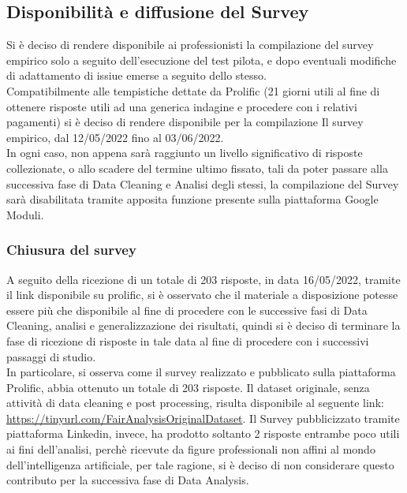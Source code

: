     
    \subsection{Disponibilità e diffusione del Survey}
    Si è deciso di rendere disponibile ai professionisti la compilazione del survey empirico solo a seguito dell'esecuzione del test pilota, e dopo eventuali modifiche di adattamento di issiue emerse a seguito dello stesso.\\ Compatibilmente alle tempistiche dettate da Prolific (21 giorni utili al fine di ottenere risposte utili ad una generica indagine e procedere con i relativi pagamenti) si è deciso di rendere disponibile per la compilazione Il survey empirico, dal 12/05/2022 fino al 03/06/2022.\\
    
    In ogni caso, non appena sarà raggiunto un livello significativo di risposte collezionate, o allo scadere del termine ultimo fissato, tali da poter passare alla successiva fase di Data Cleaning e Analisi degli stessi, la compilazione del Survey sarà disabilitata tramite apposita funzione presente sulla piattaforma Google Moduli.
    
    \subsubsection{Chiusura del survey}
    A seguito della ricezione di un totale di 203 risposte, in data 16/05/2022, tramite il link disponibile su prolific, si è osservato che il materiale a disposizione potesse essere più che disponibile al fine di procedere con le successive fasi di Data Cleaning, analisi e generalizzazione dei risultati, quindi si è deciso di terminare la fase di ricezione di risposte in tale data al fine di procedere con i successivi passaggi di studio.\\
    In particolare, si osserva come il survey realizzato e pubblicato sulla piattaforma Prolific, abbia ottenuto un totale di 203 risposte. Il dataset originale, senza attività di data cleaning e post processing, risulta disponibile al seguente link: \url{https://tinyurl.com/FairAnalysisOriginalDataset}. Il Survey pubblicizzato tramite piattaforma Linkedin, invece, ha prodotto soltanto 2 risposte entrambe poco utili ai fini dell'analisi, perchè ricevute da figure professionali non affini al mondo dell'intelligenza artificiale, per tale ragione, si è deciso di non considerare questo contributo per la successiva fase di Data Analysis.
    
